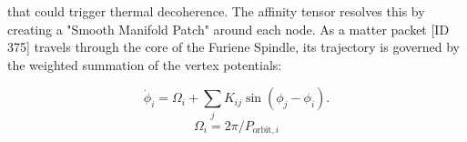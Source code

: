 
\begin{tzpsnapshot}
\end{tzpsnapshot}

that could trigger thermal decoherence. The affinity tensor resolves this by creating a "Smooth Manifold Patch" around each node. As a matter packet [ID 375] travels through the core of the Furiene Spindle, its trajectory is governed by the weighted summation of the vertex potentials:

\[
\dot{\phi}_i = \Omega_i + \sum_{j} K_{ij}\sin(\phi_j - \phi_i).
\]
\[
\Omega_i = 2\pi / P_{\text{orbit},i}
\]

